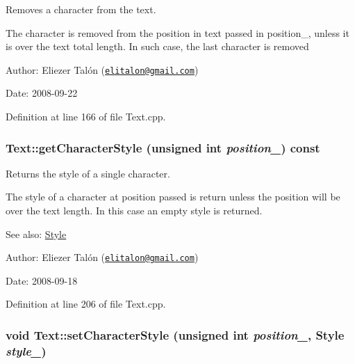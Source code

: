 Removes a character from the text. 

The character is removed from the position in text passed in position\_\-, unless it is over the text total length. In such case, the last character is removed

\begin{Desc}
\item[Author:]Eliezer Talón (\href{mailto:elitalon@gmail.com}{\tt elitalon@gmail.com}) \end{Desc}
\begin{Desc}
\item[Date:]2008-09-22 \end{Desc}


Definition at line 166 of file Text.cpp.\hypertarget{class_text_e7f5d4bb80673566a91e53f70fdfcaa2}{
\subsubsection[getCharacterStyle]{ Text::getCharacterStyle (unsigned int {\em position\_\-}) const}}
\label{class_text_e7f5d4bb80673566a91e53f70fdfcaa2}


Returns the style of a single character. 

The style of a character at position passed is return unless the position will be over the text length. In this case an empty style is returned.

\begin{Desc}
\item[See also:]\hyperlink{class_style}{Style}\end{Desc}
\begin{Desc}
\item[Author:]Eliezer Talón (\href{mailto:elitalon@gmail.com}{\tt elitalon@gmail.com}) \end{Desc}
\begin{Desc}
\item[Date:]2008-09-18 \end{Desc}


Definition at line 206 of file Text.cpp.\hypertarget{class_text_675870393c37aea8ea2018bc318620f3}{
\subsubsection[setCharacterStyle]{\setlength{\rightskip}{0pt plus 5cm}void Text::setCharacterStyle (unsigned int {\em position\_\-}, \/  {\bf Style} {\em style\_\-})}}
\label{class_text_675870393c37aea8ea2018bc318620f3}


